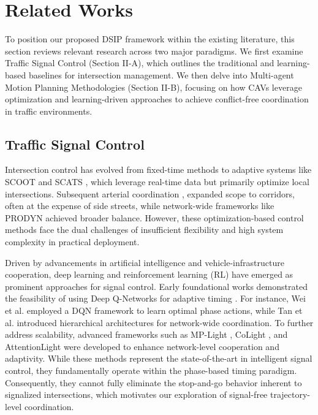 \documentclass[journal]{IEEEtran}
\begin{document}
\section{Related Works}

To position our proposed DSIP framework within the existing literature, this section reviews relevant research across two major paradigms. We first examine Traffic Signal Control (Section II-A), which outlines the traditional and learning-based baselines for intersection management. We then delve into Multi-agent Motion Planning Methodologies (Section II-B), focusing on how CAVs leverage optimization and learning-driven approaches to achieve conflict-free coordination in traffic environments.

\subsection{Traffic Signal Control}

Intersection control has evolved from fixed-time methods \cite{webster1958} to adaptive systems like SCOOT \cite{hunt1981} and SCATS \cite{sims1980}, which leverage real-time data but primarily optimize local intersections. Subsequent arterial coordination \cite{robertson1969}, \cite{wong1996} expanded scope to corridors, often at the expense of side streets, while network-wide frameworks like PRODYN \cite{henry1984} achieved broader balance. However, these optimization-based control methods face the dual challenges of insufficient flexibility and high system complexity in practical deployment.


Driven by advancements in artificial intelligence and vehicle-infrastructure cooperation, deep learning and reinforcement learning (RL) have emerged as prominent approaches for signal control. Early foundational works demonstrated the feasibility of using Deep Q-Networks for adaptive timing \cite{wei2018,van2016,zhao2019}. For instance, Wei et al. \cite{wei2018} employed a DQN framework to learn optimal phase actions, while Tan et al. \cite{tan2020} introduced hierarchical architectures for network-wide coordination. To further address scalability, advanced frameworks such as MP-Light \cite{chen2020}, CoLight \cite{colight}, and AttentionLight \cite{attentionlight} were developed to enhance network-level cooperation and adaptivity. While these methods represent the state-of-the-art in intelligent signal control, they fundamentally operate within the phase-based timing paradigm. Consequently, they cannot fully eliminate the stop-and-go behavior inherent to signalized intersections, which motivates our exploration of signal-free trajectory-level coordination.
\end{document}

